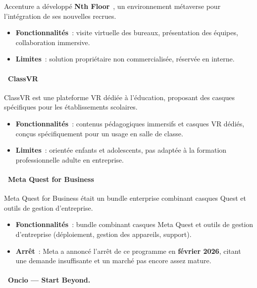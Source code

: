 Accenture a développé \textbf{Nth Floor}~\cite{accenture2025}, un environnement métaverse
pour l'intégration de ses nouvelles recrues.

\begin{itemize}
  \item \textbf{Fonctionnalités}~: visite virtuelle des bureaux, présentation des équipes,
    collaboration immersive.
  \item \textbf{Limites}~: solution propriétaire non commercialisée, réservée en interne.
\end{itemize}

\paragraph*{\textbullet~ClassVR}

ClassVR est une plateforme VR dédiée à l'éducation, proposant des casques spécifiques
pour les établissements scolaires.

\begin{itemize}
  \item \textbf{Fonctionnalités}~: contenus pédagogiques immersifs et casques VR dédiés,
    conçus spécifiquement pour un usage en salle de classe.
  \item \textbf{Limites}~: orientée enfants et adolescents, pas adaptée à la formation
    professionnelle adulte en entreprise.
\end{itemize}

\paragraph*{\textbullet~Meta Quest for Business}

Meta Quest for Business était un bundle enterprise combinant casques Quest et outils de
gestion d'entreprise.

\begin{itemize}
  \item \textbf{Fonctionnalités}~: bundle combinant casques Meta Quest et outils de gestion
    d'entreprise (déploiement, gestion des appareils, support).
  \item \textbf{Arrêt}~: Meta a annoncé l'arrêt de ce programme en \textbf{février 2026},
    citant une demande insuffisante et un marché pas encore assez mature.
\end{itemize}

\paragraph*{\textbullet~Oncio --- Start Beyond.}

